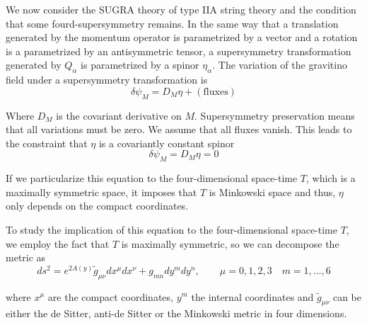 
We now consider the SUGRA theory of type IIA string theory and
the condition that some fourd-supersymmetry remains.
In the same way that a translation generated by the momentum operator is parametrized by a vector and
a rotation is a parametrized by an antisymmetric tensor, a supersymmetry transformation generated
by $Q_\alpha$ is parametrized 
by a spinor $\eta_\alpha$.
The variation of the gravitino field under a supersymmetry transformation is
\begin{equation}
  \delta \psi_M = D_M \eta + \mathrm{(fluxes)}
\end{equation}

Where $D_M$ is the covariant derivative on $M$.
Supersymmetry preservation means that all variations must be zero. 
We assume that all fluxes vanish.
This leads to the constraint that $\eta$ is a covariantly constant spinor
\begin{equation}
  \delta \psi_M = D_M \eta = 0
  \label{eq:cov}
\end{equation}

If we particularize this equation to the four-dimensional space-time  $T$, which is a maximally symmetric space, 
it imposes that $T$ is Minkowski space and thus, $\eta$ only depends on the compact coordinates.

To study the implication of this equation to the four-dimensional space-time $T$, we employ the 
fact that $T$ is maximally symmetric, so we can decompose  the metric as
\begin{equation}
  ds^2=e^{2A(y)}\tilde {g}_{\mu\nu} dx^\mu dx^\nu + g_{mn} dy^m dy^n, \qquad  \mu=0,1,2,3 \quad m=1,\dots,6
\end{equation}

where $x^\mu$ are the compact coordinates, $y^m$ the internal coordinates and $\tilde{g}_{\mu\nu}$ can 
be either the de Sitter, anti-de Sitter or the Minkowski metric in four dimensions.

